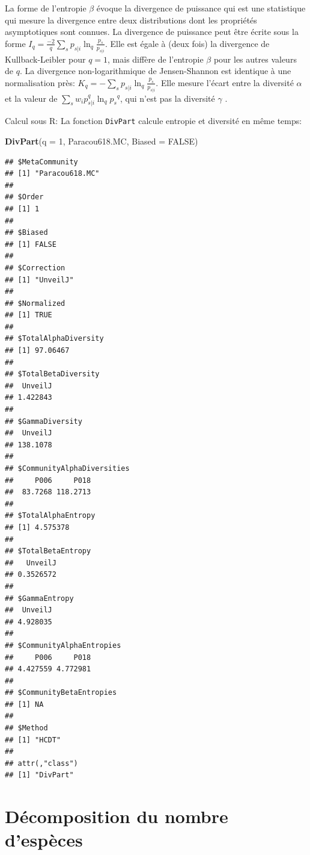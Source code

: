 \documentclass[
  11pt,
  french,
  a4paper,
  extrafontsizes,onecolumn,openright
  ]{memoir}
\newenvironment{Shaded}{\begin{snugshade}}{\end{snugshade}}
\newcommand{\AttributeTok}[1]{\textcolor[rgb]{0.13,0.29,0.53}{#1}}
\newcommand{\ConstantTok}[1]{\textcolor[rgb]{0.56,0.35,0.01}{#1}}
\newcommand{\DecValTok}[1]{\textcolor[rgb]{0.00,0.00,0.81}{#1}}
\newcommand{\FunctionTok}[1]{\textcolor[rgb]{0.13,0.29,0.53}{\textbf{#1}}}
\newcommand{\NormalTok}[1]{#1}
\begin{document}
La forme de l'entropie \(\beta\) évoque la divergence de puissance \autocite{Cressie1984} qui est une statistique qui mesure la divergence entre deux distributions dont les propriétés asymptotiques sont connues.
La divergence de puissance peut être écrite sous la forme \(I_q= \frac{-2}{q} \sum_s{p_{s|i} \ln_q\frac{p_{s}}{p_{s|i}}}\).
Elle est égale à (deux fois) la divergence de Kullback-Leibler pour \(q=1\), mais diffère de l'entropie \(\beta\) pour les autres valeurs de \(q\).
La divergence non-logarithmique de Jensen-Shannon \autocite{Lamberti2003} est identique à une normalisation près: \(K_q= -\sum_s{p_{s|i} \ln_q\frac{p_{s}}{p_{s|i}}}\).
Elle mesure l'écart entre la diversité \(\alpha\) et la valeur de \(\sum_s{w_i p^q_{s|i} \ln_q{p_s}^q}\), qui n'est pas la diversité \(\gamma\) \autocite{Marcon2014a}.

Calcul sous R: La fonction \texttt{DivPart} calcule entropie et diversité en même temps:

\scriptsize

\begin{Shaded}
\begin{Highlighting}[]
\FunctionTok{DivPart}\NormalTok{(}\AttributeTok{q =} \DecValTok{1}\NormalTok{, Paracou618.MC, }\AttributeTok{Biased =} \ConstantTok{FALSE}\NormalTok{)}
\end{Highlighting}
\end{Shaded}

\begin{verbatim}
## $MetaCommunity
## [1] "Paracou618.MC"
## 
## $Order
## [1] 1
## 
## $Biased
## [1] FALSE
## 
## $Correction
## [1] "UnveilJ"
## 
## $Normalized
## [1] TRUE
## 
## $TotalAlphaDiversity
## [1] 97.06467
## 
## $TotalBetaDiversity
##  UnveilJ 
## 1.422843 
## 
## $GammaDiversity
##  UnveilJ 
## 138.1078 
## 
## $CommunityAlphaDiversities
##     P006     P018 
##  83.7268 118.2713 
## 
## $TotalAlphaEntropy
## [1] 4.575378
## 
## $TotalBetaEntropy
##   UnveilJ 
## 0.3526572 
## 
## $GammaEntropy
##  UnveilJ 
## 4.928035 
## 
## $CommunityAlphaEntropies
##     P006     P018 
## 4.427559 4.772981 
## 
## $CommunityBetaEntropies
## [1] NA
## 
## $Method
## [1] "HCDT"
## 
## attr(,"class")
## [1] "DivPart"
\end{verbatim}

\normalsize

\section{Décomposition du nombre d'espèces}\label{duxe9composition-du-nombre-despuxe8ces}
\end{document}

